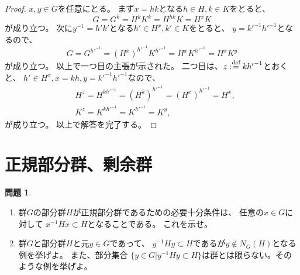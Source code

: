 \documentclass[uplatex]{jsreport}
\theoremstyle{definition}
\newtheorem{prob}[prob]{問題}
\newcommand{\dfn}{:\overset{\mbox{{\scriptsize def}}}{=}}
\begin{document}
\begin{proof}
  \(x,y\in G\)を任意にとる。
  まず\(x = hk\)となる\(h\in H, k\in K\)をとると、
  \[G = G^k = H^kK^k = H^{hk}K = H^xK\]
  が成り立つ。
  次に\(y^{-1} = h'k'\)となる\(h'\in H^x, k'\in K\)をとると、
  \(y = {k'}^{-1}{h'}^{-1}\)となるので、
  \[G = G^{{h'}^{-1}} = (H^x)^{{h'}^{-1}}K^{{h'}^{-1}} = H^xK^{{h'}^{-1}} = H^xK^y\]
  が成り立つ。
  以上で一つ目の主張が示された。
  二つ目は、\(z\dfn k{h'}^{-1}\)とおくと、
  \(h'\in H^x, x = kh, y = {k'}^{-1}{h'}^{-1}\)なので、
  \begin{align*}
    &H^z = H^{k{h'}^{-1}} = (H^k)^{{h'}^{-1}} = (H^x)^{{h'}^{-1}} = H^x, \\
    &K^z = K^{k{h'}^{-1}} = K^{{h'}^{-1}} = K^y,
  \end{align*}
  が成り立つ。
  以上で解答を完了する。
\end{proof}








\section{正規部分群、剰余群}




\begin{prob}
  \
  \begin{enumerate}
    \item
    群\(G\)の部分群\(H\)が正規部分群であるための必要十分条件は、
    任意の\(x\in G\)に対して
    \(x^{-1}Hx\subset H\)となることである。
    これを示せ。
    \item
    群\(G\)と部分群\(H\)と元\(y\in G\)であって、
    \(y^{-1}Hy \subset H\)であるが\(y\not\in N_G(H)\)となる例を挙げよ。
    また、部分集合
    \(\{y\in G| y^{-1}Hy\subset H\}\)は群とは限らない。そのような例を挙げよ。
  \end{enumerate}
\end{prob}
\end{document}
